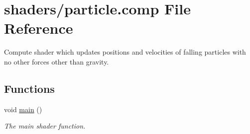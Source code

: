 \hypertarget{particle_8comp}{}\section{shaders/particle.comp File Reference}
\label{particle_8comp}


Compute shader which updates positions and velocities of falling particles with no other forces other than gravity.  


\subsection*{Functions}
\begin{DoxyCompactItemize}
\item 
void \hyperlink{particle_8comp_acdef7a1fd863a6d3770c1268cb06add3}{main} ()
\begin{DoxyCompactList}\small\item\em The main shader function. \end{DoxyCompactList}\end{DoxyCompactItemize}
